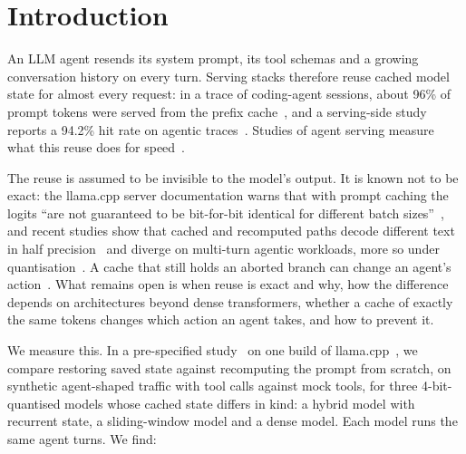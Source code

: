 \section{Introduction}
\label{sec:intro}

An LLM agent resends its system prompt, its tool schemas and a growing
conversation history on every turn. Serving stacks therefore reuse cached model
state for almost every request: in a trace of coding-agent sessions, about 96\%
of prompt tokens were served from the prefix cache~\cite{tracelab}, and a
serving-side study reports a 94.2\% hit rate on agentic traces~\cite{vllm-mooncake}.
Studies of agent serving measure what this reuse does for
speed~\cite{tracelab,vllm-mooncake,policy-runtime}.

The reuse is assumed to be invisible to the model's output. It is known not to
be exact: the llama.cpp server documentation warns that with prompt caching the
logits ``are not guaranteed to be bit-for-bit identical for different batch
sizes''~\cite{llamacpp-server}, and recent studies show that cached and
recomputed paths decode different text in half precision~\cite{chodavarapu-fp16,lorup-stage-replay}
and diverge on multi-turn agentic workloads, more so under
quantisation~\cite{patodiya-cache-divergence}. A cache that still holds an
aborted branch can change an agent's action~\cite{zhang-rollback}. What remains
open is when reuse is exact and why, how the difference depends on
architectures beyond dense transformers, whether a cache of exactly the same
tokens changes which action an agent takes, and how to prevent it.

We measure this. In a pre-specified study~\preregcite{} on one build of
llama.cpp~\cite{llamacpp}, we compare restoring saved state against recomputing
the prompt from scratch, on synthetic agent-shaped traffic with tool calls
against mock tools, for three 4-bit-quantised models whose cached state differs
in kind: a hybrid model with recurrent state, a sliding-window model and a
dense model. Each model runs the same \TurnsPerModel{} agent turns. We find:

